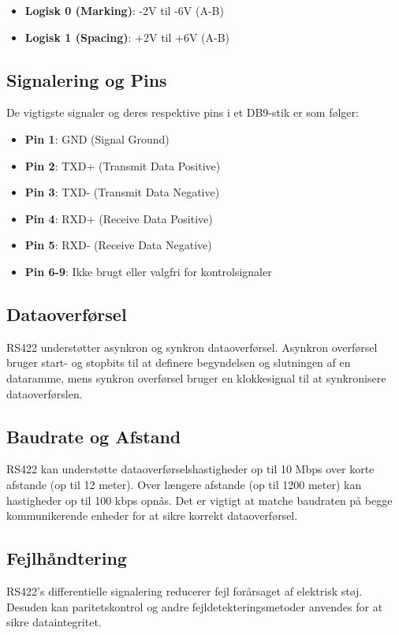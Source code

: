 \begin{itemize}
	\item \textbf{Logisk 0 (Marking)}: -2V til -6V (A-B)
	\item \textbf{Logisk 1 (Spacing)}: +2V til +6V (A-B)
\end{itemize}

\subsection{Signalering og Pins}
De vigtigste signaler og deres respektive pins i et DB9-stik er som følger:

\begin{itemize}
	\item \textbf{Pin 1}: GND (Signal Ground)
	\item \textbf{Pin 2}: TXD+ (Transmit Data Positive)
	\item \textbf{Pin 3}: TXD- (Transmit Data Negative)
	\item \textbf{Pin 4}: RXD+ (Receive Data Positive)
	\item \textbf{Pin 5}: RXD- (Receive Data Negative)
	\item \textbf{Pin 6-9}: Ikke brugt eller valgfri for kontrolsignaler
\end{itemize}

\subsection{Dataoverførsel}
RS422 understøtter asynkron og synkron dataoverførsel. Asynkron overførsel bruger start- og stopbits til at definere begyndelsen og slutningen af en dataramme, mens synkron overførsel bruger en klokkesignal til at synkronisere dataoverførslen.

\subsection{Baudrate og Afstand}
RS422 kan understøtte dataoverførselshastigheder op til 10 Mbps over korte afstande (op til 12 meter). Over længere afstande (op til 1200 meter) kan hastigheder op til 100 kbps opnås. Det er vigtigt at matche baudraten på begge kommunikerende enheder for at sikre korrekt dataoverførsel.

\subsection{Fejlhåndtering}
RS422's differentielle signalering reducerer fejl forårsaget af elektrisk støj. Desuden kan paritetskontrol og andre fejldetekteringsmetoder anvendes for at sikre dataintegritet.


